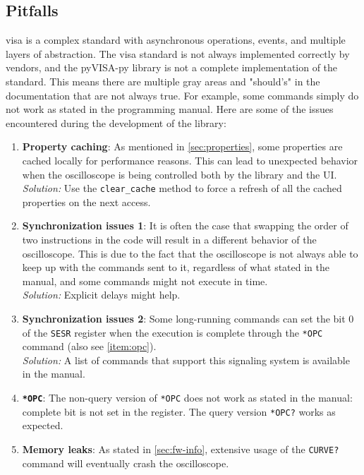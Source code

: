 \documentclass[a4paper,english,twoside,10pt]{article}
\begin{document}
\subsection{Pitfalls}\label{sec:pitfalls}
\gls{visa} is a complex standard with asynchronous operations, events, and multiple layers of abstraction. The \gls{visa} standard is not always implemented correctly by vendors, and the pyVISA-py library is not a complete implementation of the standard. This means there are multiple gray areas and "should's" in the documentation that are not always true. For example, some commands simply do not work as stated in the programming manual\cite{tektronix:mso-progman}. Here are some of the issues encountered during the development of the library:
\begin{enumerate}[label=\textbf{P.\arabic*},ref=P.\arabic*]
	\item \textbf{Property caching}: As mentioned in \ref{sec:properties}, some properties are cached locally for performance reasons. This can lead to unexpected behavior when the oscilloscope is being controlled both by the library and the UI.\\
	\textit{Solution:} Use the \texttt{clear\_cache} method to force a refresh of all the cached properties on the next access.
	\item \textbf{Synchronization issues 1}: It is often the case that swapping the order of two instructions in the code will result in a different behavior of the oscilloscope. This is due to the fact that the oscilloscope is not always able to keep up with the commands sent to it, regardless of what stated in the manual\cite[p.~1915]{tektronix:mso-progman}, and some commands might not execute in time.\\
	\textit{Solution:} Explicit delays might help.
	\item \textbf{Synchronization issues 2}: Some long-running commands can set the bit 0 of the \texttt{SESR} register when the execution is complete through the \texttt{*OPC} command (also see \autoref{item:opc}).\\
	\textit{Solution:} A list of commands that support this signaling system is available in the manual\cite[t.~3-3]{tektronix:mso-progman}.
	\item \textbf{\texttt{*OPC}}\label{item:opc}: The non-query version of \texttt{*OPC} does not work as stated in the manual\cite[p.~1001]{tektronix:mso-progman}: complete bit is not set in the register. The query version \texttt{*OPC?} works as expected.
	\item \textbf{Memory leaks}\label{item:curvestream}: As stated in \ref{sec:fw-info}, extensive usage of the \texttt{CURVE?} command will eventually crash the oscilloscope.\\

\end{enumerate}
\end{document}
